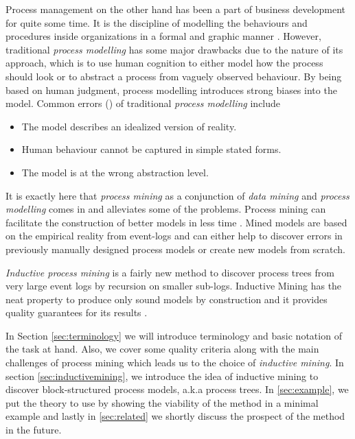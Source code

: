 \documentclass[a4paper]{IEEEtran}
\begin{document}
Process management on the other hand has been a part of business development for quite some time. It is the discipline of modelling the behaviours and procedures inside organizations in a formal and graphic manner \cite{jeston2014business}. However, traditional \textit{process modelling} has some major drawbacks due to the nature of its approach, which is to use human cognition to either model how the process should look or to abstract a process from vaguely observed behaviour. By being based on human judgment, process modelling introduces strong biases into the model.
Common errors (\cite{process_mining, pitfalls}) of traditional \textit{process modelling} include
\begin{itemize}
    \item The model describes an idealized version of reality.
    \item Human behaviour cannot be captured in simple stated forms.
    \item The model is at the wrong abstraction level. 
\end{itemize}

It is exactly here that \textit{process mining} as a conjunction of \textit{data mining} and \textit{process modelling} comes in and alleviates some of the problems. 
Process mining can facilitate the construction of better models in less time \cite{process_mining}. Mined models are based on the empirical reality from event-logs and can either help to discover errors in previously manually designed process models or create new models from scratch.

\textit{Inductive process mining} is a fairly new method to discover process trees from very large event logs by recursion on smaller sub-logs. Inductive Mining has the neat property to produce only sound models by construction and it provides quality guarantees for its results \cite{leemans2015scalable, inductivemining-constructive}.

In Section \ref{sec:terminology} we will introduce terminology and basic notation of the task at hand. Also, we cover some quality criteria along with the main challenges of process mining which leads us to the choice of \textit{inductive mining}. In section \ref{sec:inductivemining}, we introduce the idea of inductive mining to discover block-structured process models, a.k.a process trees. In \ref{sec:example}, we put the theory to use by showing the viability of the method in a minimal example and lastly in \ref{sec:related} we shortly discuss the prospect of the method in the future.
\end{document}
